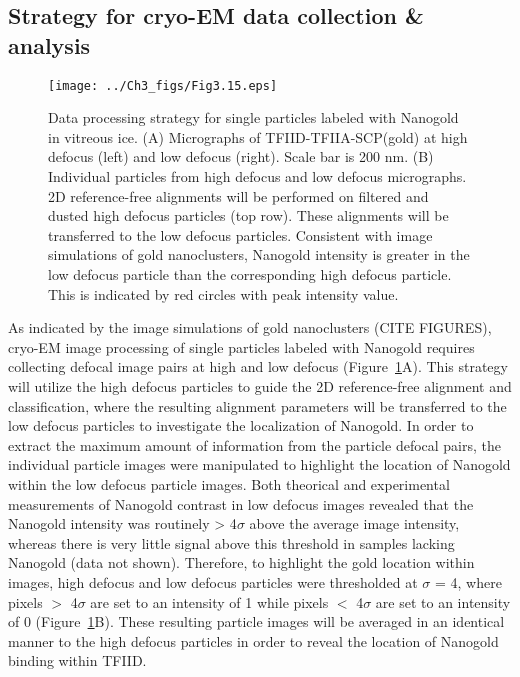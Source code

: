\subsection{Strategy for cryo-EM data collection \& analysis}
\begin{figure}
\centering
\texttt{[image: ../Ch3\_figs/Fig3.15.eps]}
\caption[Data processing strategy for single particles labeled with Nanogold in vitreous ice]{Data processing strategy for single particles labeled with Nanogold in vitreous ice. (A) Micrographs of TFIID-TFIIA-SCP(gold) at high defocus (left) and low defocus (right). Scale bar is 200 nm. (B) Individual particles from high defocus and low defocus micrographs. 2D reference-free alignments will be performed on filtered and dusted high defocus particles (top row).  These alignments will be transferred to the low defocus particles. Consistent with image simulations of gold nanoclusters, Nanogold intensity is greater in the low defocus particle than the corresponding high defocus particle.  This is indicated by red circles with peak intensity value.}
\label{fig:Fig3.15}
\end{figure}
As indicated by the image simulations of gold nanoclusters (CITE FIGURES), cryo-EM image processing of single particles labeled with Nanogold requires collecting defocal image pairs at high and low defocus (Figure~\ref{fig:Fig3.15}A). This strategy will utilize the high defocus particles to guide the 2D reference-free alignment and classification, where the resulting alignment parameters will be transferred to the low defocus particles to investigate the localization of Nanogold. In order to extract the maximum amount of information from the particle defocal pairs, the individual particle images were manipulated to highlight the location of Nanogold within the low defocus particle images. Both theorical and experimental measurements of Nanogold contrast in low defocus images revealed that the Nanogold intensity was routinely > 4$\sigma$ above the average image intensity, whereas there is very little signal above this threshold in samples lacking Nanogold (data not shown). Therefore, to highlight the gold location within images, high defocus and low defocus particles were thresholded at $\sigma$ = 4, where pixels $>$ 4$\sigma$ are set to an intensity of 1 while pixels $<$ 4$\sigma$ are set to an intensity of 0 (Figure~\ref{fig:Fig3.15}B). These resulting particle images will be averaged in an identical manner to the high defocus particles in order to reveal the location of Nanogold binding within TFIID.   \\

